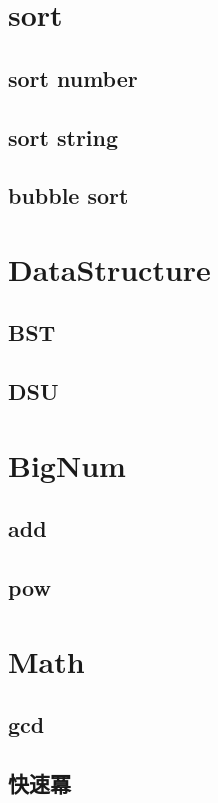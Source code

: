 \section{sort}
\subsection{sort number} 

\subsection{sort string} 

\subsection{bubble sort} 

\section{DataStructure}
\subsection{BST} 

\subsection{DSU} 

\section{BigNum}
\subsection{add} 

\subsection{pow} 

\section{Math}
\subsection{gcd} 

\subsection{快速冪} 


